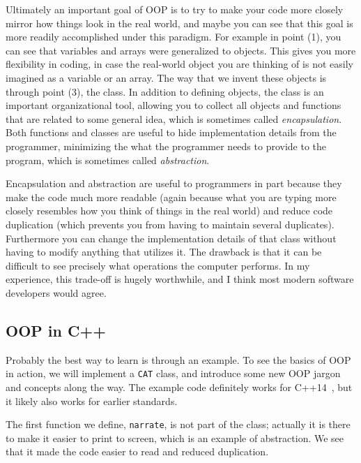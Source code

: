 Ultimately an important goal of OOP is to try to make your code more closely
mirror how things look in the real world, and maybe you can see that this
goal is more readily accomplished under this paradigm.
For example in point (1), you can see that variables
and arrays were generalized to objects. This gives you more flexibility in
coding, in case the real-world object you are thinking of is not easily
imagined as a variable or an array. The way that we invent these objects
is through point (3), the class. In addition to defining objects, the
class is an important organizational tool, allowing you to collect all
objects and functions that are related to some general idea,
which is sometimes called 
{\it encapsulation}. Both functions and classes
are useful to hide implementation details from the programmer, minimizing
the what the programmer needs to provide to the program, which is
sometimes called {\it abstraction}.

Encapsulation and abstraction are useful to programmers in part because
they make the code much more readable (again because what you are typing
more closely resembles how you think of things in the real world) and
reduce code duplication (which prevents you from having to maintain
several duplicates). Furthermore you
can change the implementation details of that class
without having to modify anything that utilizes it. The drawback is that
it can be difficult to see precisely what operations the computer
performs. In my experience, this trade-off is hugely worthwhile, and I think
most modern software developers would agree.

\subsection{OOP in C++} 
Probably the best way to learn is through an example. To see the basics
of OOP in action, we will implement a \texttt{CAT} class, and 
introduce some new OOP jargon and concepts along the way.
The example code definitely works for C++14~\cite{cppDocumentation},
but it likely also works for earlier standards.

The first function we define, \texttt{narrate}, is not part of the class;
actually it is there to make it easier to print to screen, which is
an example of abstraction. We see that it made the code easier to
read and reduced duplication.\\



